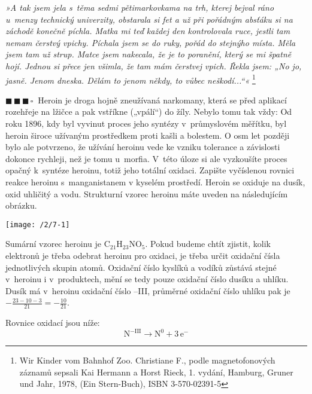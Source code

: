 \documentclass{book}
\newcommand{\tri}{$\blacksquare \, \blacksquare \, \blacksquare \, \square \; \; $}
\renewenvironment{quotation}{\par}{\par} %
\begin{document}
\hrulefill
\begin{quotation}
\textit{»A tak jsem jela s~těma sedmi pětimarkovkama na trh, kterej bejval
ráno u~menzy technický univerzity, obstarala si fet a už při pořádným
absťáku si na záchodě konečně píchla. Matka mi teď každej den kontrolovala
ruce, jestli tam nemam čerstvý vpichy. Píchala jsem se do ruky, pořád
do stejnýho místa. Měla jsem tam už strup. Matce jsem nakecala, že
je to poranění, který se mi špatně hojí. Jednou si přece jen všimla,
že tam mám čerstvej vpich. Řekla jsem: „No jo, jasně. Jenom dneska.
Dělám to jenom někdy, to vůbec neškodí...“« }\footnote{Wir Kinder vom Bahnhof Zoo. Christiane F., podle magnetofonových záznamů sepsali Kai Hermann a Horst Rieck, 1. vydání, Hamburg, Gruner und Jahr, 1978, (Ein Stern-Buch), ISBN 3-570-02391-5}

\tri Heroin je droga hojně zneužívaná narkomany, která se před aplikací
rozehřeje na lžičce a pak vstříkne („vpálí“) do žíly. Nebylo tomu
tak vždy: Od roku 1896, kdy byl vyvinut proces jeho syntézy v~průmyslovém
měřítku, byl heroin široce užívaným prostředkem proti kašli a bolestem.
O osm let později bylo ale potvrzeno, že užívání heroinu vede ke vzniku
tolerance a závislosti dokonce rychleji, než je tomu u~morfia. V~této
úloze si ale vyzkoušíte proces opačný k~syntéze heroinu, totiž jeho
totální oxidaci. Zapište vyčíslenou rovnici reakce heroinu s~manganistanem
v kyselém prostředí. Heroin se oxiduje na dusík, oxid uhličitý a vodu.
Strukturní vzorec heroinu máte uveden na následujícím obrázku.

\begin{center}
\texttt{[image: /2/7-1]}
\par \end{center}
\end{quotation} \dotfill \par 
Sumární vzorec heroinu je $\mathrm{C_{21}H_{23}NO_{5}}$. Pokud budeme chtít zjistit, kolik elektronů je třeba odebrat heroinu pro oxidaci, je třeba určit oxidační čísla jednotlivých skupin atomů. Oxidační číslo kyslíků a vodíků zůstává stejné v~heroinu i v~produktech, mění se tedy pouze oxidační číslo dusíku a uhlíku. Dusík má v~heroinu oxidační
číslo --III, průměrné oxidační číslo uhlíku pak je $-\frac{23-10-3}{21}=-\frac{10}{21}$.

Rovnice oxidací jsou níže:
\[
\mathrm{N^{-III}\rightarrow N^{0}+3\,e^{-}}
\]
\end{document}
